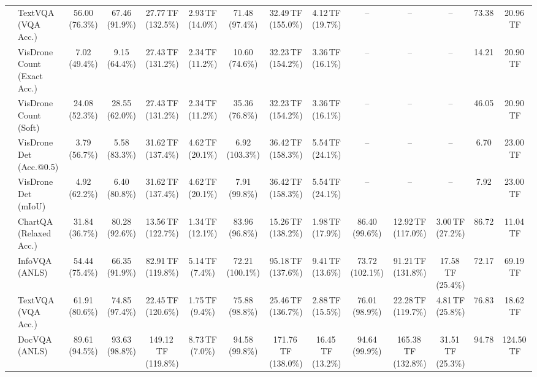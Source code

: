 \begin{table}[t]
\begin{center}
\begin{small}
\begin{sc}
{\begin{tabular}{llcccccccccccc}
& TextVQA (VQA Acc.) & 56.00 (76.3\%) & 67.46 (91.9\%) & 27.77\,TF (132.5\%) & 2.93\,TF (14.0\%) & 71.48 (97.4\%) & 32.49\,TF (155.0\%) & 4.12\,TF (19.7\%) & -- & -- & -- & 73.38 & 20.96\,TF \\
& VisDrone Count (Exact Acc.) & 7.02 (49.4\%) & 9.15 (64.4\%) & 27.43\,TF (131.2\%) & 2.34\,TF (11.2\%) & 10.60 (74.6\%) & 32.23\,TF (154.2\%) & 3.36\,TF (16.1\%) & -- & -- & -- & 14.21 & 20.90\,TF \\
& VisDrone Count (Soft) & 24.08 (52.3\%) & 28.55 (62.0\%) & 27.43\,TF (131.2\%) & 2.34\,TF (11.2\%) & 35.36 (76.8\%) & 32.23\,TF (154.2\%) & 3.36\,TF (16.1\%) & -- & -- & -- & 46.05 & 20.90\,TF \\
& VisDrone Det (Acc.@0.5) & 3.79 (56.7\%) & 5.58 (83.3\%) & 31.62\,TF (137.4\%) & 4.62\,TF (20.1\%) & 6.92 (103.3\%) & 36.42\,TF (158.3\%) & 5.54\,TF (24.1\%) & -- & -- & -- & 6.70 & 23.00\,TF \\
& VisDrone Det (mIoU) & 4.92 (62.2\%) & 6.40 (80.8\%) & 31.62\,TF (137.4\%) & 4.62\,TF (20.1\%) & 7.91 (99.8\%) & 36.42\,TF (158.3\%) & 5.54\,TF (24.1\%) & -- & -- & -- & 7.92 & 23.00\,TF \\
\midrule\midrule
{}
& ChartQA (Relaxed Acc.) & 31.84 (36.7\%) & 80.28 (92.6\%) & 13.56\,TF (122.7\%) & 1.34\,TF (12.1\%) & 83.96 (96.8\%) & 15.26\,TF (138.2\%) & 1.98\,TF (17.9\%) & 86.40 (99.6\%) & 12.92\,TF (117.0\%) & 3.00\,TF (27.2\%) & 86.72 & 11.04\,TF \\
& InfoVQA (ANLS) & 54.44 (75.4\%) & 66.35 (91.9\%) & 82.91\,TF (119.8\%) & 5.14\,TF (7.4\%) & 72.21 (100.1\%) & 95.18\,TF (137.6\%) & 9.41\,TF (13.6\%) & 73.72 (102.1\%) & 91.21\,TF (131.8\%) & 17.58\,TF (25.4\%) & 72.17 & 69.19\,TF \\
& TextVQA (VQA Acc.) & 61.91 (80.6\%) & 74.85 (97.4\%) & 22.45\,TF (120.6\%) & 1.75\,TF (9.4\%) & 75.88 (98.8\%) & 25.46\,TF (136.7\%) & 2.88\,TF (15.5\%) & 76.01 (98.9\%) & 22.28\,TF (119.7\%) & 4.81\,TF (25.8\%) & 76.83 & 18.62\,TF \\
& DocVQA (ANLS) & 89.61 (94.5\%) & 93.63 (98.8\%) & 149.12\,TF (119.8\%) & 8.73\,TF (7.0\%) & 94.58 (99.8\%) & 171.76\,TF (138.0\%) & 16.45\,TF (13.2\%) & 94.64 (99.9\%) & 165.38\,TF (132.8\%) & 31.51\,TF (25.3\%) & 94.78 & 124.50\,TF \\

\end{tabular}}
\end{sc}
\end{small}
\end{center}
\end{table}
